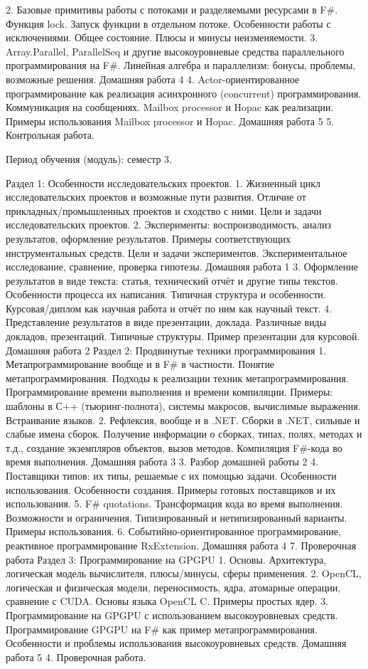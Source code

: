     2. Базовые примитивы работы с потоками и разделяемыми ресурсами в F#. Функция lock. Запуск функции в отдельном потоке. Особенности работы с исключениями. Общее состояние. Плюсы и минусы неизменяемости.
    3. Array.Parallel, ParallelSeq и другие высокоуровневые средства параллельного программирования на F#. Линейная алгебра и параллелизм: бонусы, проблемы, возможные решения.
Домашняя работа 4
    4. Actor-ориентированное программирование как реализация асинхронного (concurrent) программирования. Коммуникация на сообщениях. Mailbox processor и Hopac как реализации. Примеры использования Mailbox processor и Hopac.
Домашняя работа 5
    5. Контрольная работа.

Период обучения (модуль): семестр 3.

Раздел 1: Особенности исследовательских проектов.
    1. Жизненный цикл исследовательских проектов и возможные пути развития. Отличие от прикладных/промышленных проектов и сходство с ними. Цели и задачи исследовательских проектов. 
    2. Эксперименты: воспроизводимость, анализ результатов, оформление результатов. Примеры соответствующих инструментальных средств. Цели и задачи экспериментов. Экспериментальное исследование, сравнение, проверка гипотезы.
Домашняя работа 1
    3. Оформление результатов в виде текста: статья, технический отчёт и другие типы текстов. Особенности процесса их написания. Типичная структура и особенности. Курсовая/диплом как научная работа и отчёт по ним как научный текст.
    4. Представление результатов в виде презентации, доклада. Различные виды докладов, презентаций. Типичные структуры. Пример презентации для курсовой.
Домашняя работа 2
Раздел 2: Продвинутые техники программирования 
    1. Метапрограммирование вообще и в F# в частности. Понятие метапрограммирования. Подходы к реализации техник метапрограммирования.  Программирование времени выполнения и времени компиляции. Примеры: шаблоны в С++ (тьюринг-полнота), системы макросов, вычислимые выражения. Встраивание языков.
    2. Рефлексия, вообще и в .NET. Сборки в .NET, сильные и слабые имена сборок. Получение информации о сборках, типах, полях, методах и т.д., создание экземпляров объектов, вызов методов. Компиляция F#-кода во время выполнения.
Домашняя работа 3
    3. Разбор домашней работы 2   
    4. Поставщики типов: их типы, решаемые с их помощью задачи. Особенности использования. Особенности создания. Примеры готовых поставщиков и их использования.
    5. F# quotations. Трансформация кода во время выполнения. Возможности и ограничения. Типизированный и нетипизированный варианты. Примеры использования.
    6. Событийно-ориентированное программирование, реактивное программирование RxExtension.
Домашняя работа 4
    7. Проверочная работа
Раздел 3: Программирование на GPGPU
    1. Основы. Архитектура, логическая модель вычислителя, плюсы/минусы, сферы применения.
    2. OpenCL, логическая и физическая модели, переносимость, ядра, атомарные операции, сравнение с CUDA. Основы языка OpenCL C. Примеры простых ядер.
    3. Программирование на GPGPU с использованием высокоуровневых средств. Программирование GPGPU на F# как пример метапрограммирования. Особенности и проблемы использования высокоуровневых средств.
Домашняя работа 5
    4. Проверочная работа.

